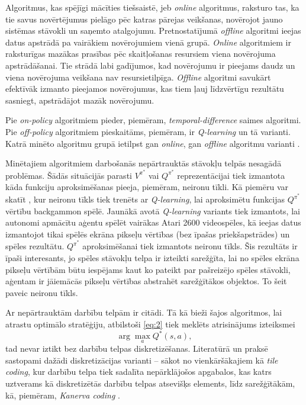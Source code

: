 \documentclass{ludis} %
\begin{document}
Algoritmus, kas spējīgi mācīties tiešsaistē, jeb \textit{online} algoritmus,
raksturo tas, ka tie savus novērtējumus pielāgo pēc katras pārejas veikšanas,
novērojot jauno sistēmas stāvokli un saņemto atalgojumu. Pretnostatījumā
\textit{offline} algoritmi ieejas datus apstrādā pa vairākiem novērojumiem vienā
grupā. \textit{Online} algoritmiem ir raksturīgas mazākas prasības pēc
skaitļošanas resursiem viena novērojuma apstrādāšanai. Tie strādā labi
gadījumos, kad novērojumu ir pieejams daudz un viena novērojuma veikšana nav
resursietilpīga. \textit{Offline} algoritmi savukārt efektīvāk izmanto pieejamos
novērojumus, kas tiem ļauj līdzvērtīgu rezultātu sasniegt, apstrādājot mazāk
novērojumu.

Pie \textit{on-policy} algoritmiem pieder, piemēram,
\textit{temporal-difference} saimes algoritmi. Pie \textit{off-policy}
algoritmiem pieskaitāms, piemēram, ir \textit{Q-learning} \autocite{Watkins1989}
\autocite{Watkins1992} un tā varianti. Katrā minēto algoritmu grupā ietilpst gan
\textit{online}, gan \textit{offline} algoritmu varianti \autocite{Barto}.

Minētajiem algoritmiem darbošanās nepārtrauktās stāvokļu telpās nesagādā
problēmas. Šādās situācijās parasti $V^{\pi^*}$ vai $Q^{\pi^*}$ reprezentācijai
tiek izmantota kāda funkciju aproksimēšanas pieeja, piemēram, neironu tīkli. Kā
piemēru var skatīt \autocite{tesauro1995temporal}, kur neironu tīkls tiek
trenēts ar \textit{Q-learning}, lai aproksimētu funkcijas $Q^{\pi^*}$ vērtību
backgammon spēlē. Jaunākā avotā \autocite{mnih2013playing} \textit{Q-learning}
variants tiek izmantots, lai autonomi apmācītu aģentu spēlēt vairākas Atari 2600
videospēles, kā ieejas datus izmantojot tikai spēlēs ekrāna pikseļu vērtības
(bez īpašas priekšapstrādes) un spēles rezultātu. $Q^{\pi^*}$ aproksimēšanai
tiek izmantots neironu tīkls. Šis rezultāts ir īpaši interesants, jo spēles
stāvokļu telpa ir izteikti sarežģīta, lai no spēles ekrāna pikseļu vērtībām būtu
iespējams kaut ko pateikt par pašreizējo spēles stāvokli, aģentam ir jāiemācās
pikseļu vērtības abstrahēt sarežģītākos objektos. To šeit paveic neironu tīkls.

Ar nepārtrauktām darbību telpām ir citādi. Tā kā bieži šajos algoritmos, lai
atrastu optimālo stratēģiju, atbilstoši \eqref{eq:2} tiek meklēts atrisinājums
izteiksmei
\[
	\arg \max_a Q^*(s, a),
\]
tad nevar iztikt bez darbību telpas diskretizēšanas. Literatūrā un praksē
sastopami dažādi diskretizācijas varianti -- sākot no vienkāršākajiem kā
\textit{tile coding}, kur darbību telpa tiek sadalīta nepārklājošos apgabalos,
kas katrs uztverams kā diskretizētās darbību telpas atsevišķs elements, līdz
sarežģītākām, kā, piemēram, \textit{Kanerva coding} \autocite{Barto}.
\end{document}
